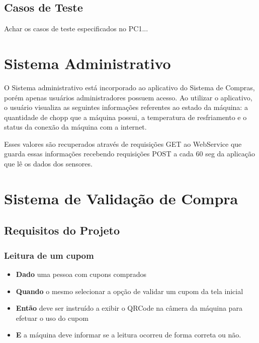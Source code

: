 \subsection{Casos de Teste}

Achar os casos de teste especificados no PC1...


\section[Sistema Administrativo]{Sistema Administrativo}

O Sistema administrativo está incorporado ao aplicativo do Sistema de Compras, porém apenas usuários
administradores possuem acesso. Ao utilizar o aplicativo, o usuário visualiza
as seguintes informações referentes ao estado da máquina: a quantidade de chopp que a
máquina possui, a temperatura de resfriamento e o status da conexão da máquina com a internet.

Esses valores são recuperados através de requisições GET ao WebService que guarda essas informações recebendo
requisições POST a cada 60 seg da aplicação que lê os dados dos sensores. 

\section[Sistema de Validação de Compra]{Sistema de Validação de Compra}
    \subsection[Requisitos do Projeto]{Requisitos do Projeto}
        \subsubsection[Leitura de um cupom]{Leitura de um cupom}
            \begin{itemize}
                    \item \textbf{Dado} uma pessoa com cupons comprados
                    \item \textbf{Quando} o mesmo selecionar a opção de validar um cupom da tela inicial
                    \item \textbf{Então} deve ser instruído a exibir o QRCode na câmera da máquina para
                            efetuar o uso do cupom
                    \item \textbf{E} a máquina deve informar se a leitura ocorreu de forma correta ou não.
            \end{itemize}

